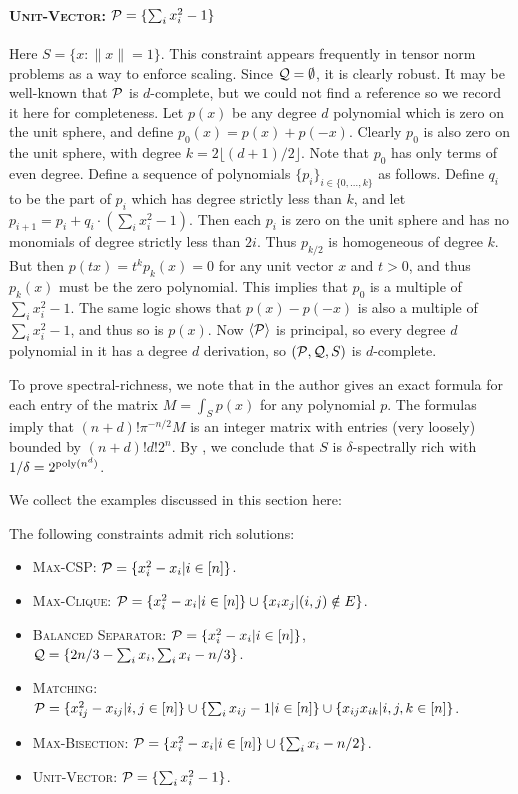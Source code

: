 \paragraph{\textsc{Unit-Vector}: $\mathcal P = \{\sum_i x_i^2 - 1\}$} Here $S = \{x: \|x\| = 1\}$. This constraint appears frequently in tensor norm problems as a way to enforce scaling. Since $\mathcal Q = \emptyset$, it is clearly robust. It may be well-known that $\mathcal P$ is $d$-complete, but we could not find a reference so we record it here for completeness. Let $p(x)$ be any degree $d$ polynomial which is zero on the unit sphere, and define $p_0(x) = p(x) + p(-x)$. Clearly $p_0$ is also zero on the unit sphere, with degree $k = 2\lfloor (d+1)/2 \rfloor$. Note that $p_0$ has only terms of even degree. 
%
Define a sequence of polynomials $\{p_i\}_{i \in \{0,\ldots, k\}}$ as follows.
Define $q_i$ to be the part of $p_i$ which has degree strictly less than $k$, and let $p_{i+1} = p_i + q_i\cdot(\sum_i x_i^2 - 1)$. Then each $p_i$ is zero on the unit sphere and has no monomials of degree strictly less than $2i$. Thus $p_{k/2}$ is homogeneous of degree $k$. But then $p(tx) = t^kp_k(x) = 0$ for any unit vector $x$ and $t > 0$, and thus $p_k(x)$ must be the zero polynomial. This implies that $p_0$ is a multiple of $\sum_i x_i^2 - 1$. The same logic shows that $p(x) - p(-x)$ is also a multiple of $\sum_i x_i^2 - 1$, and thus so is $p(x)$. Now $\langle \mathcal P\rangle$ is principal, so every degree $d$ polynomial in it has a degree $d$ derivation, so $(\mathcal P, \mathcal Q, S)$ is $d$-complete.

To prove spectral-richness, we note that in \cite{10.2307/2695802} the author gives an exact formula for each entry of the matrix $M = \int_{S} p(x)$ for any polynomial $p$. The formulas imply that $(n+d)!\pi^{-n/2} M$ is an integer matrix with entries (very loosely) bounded by $(n+d)!d!2^n$. By , we conclude that $S$ is $\delta$-spectrally rich with $1/\delta = 2^{\operatorname{poly}(n^d)}$.


We collect the examples discussed in this section here:
\begin{corollary}\label{cor:examples}
The following constraints admit rich solutions:
\begin{itemize}
\item \textsc{Max-CSP}: $\mathcal P = \{x_i^2 - x_i | i \in [n]\}$. 
\item \textsc{Max-Clique}: $\mathcal P = \{x_i^2 - x_i | i \in [n]\} \cup \{x_ix_j | (i,j) \notin E\}$.
\item \textsc{Balanced Separator}: $\mathcal P = \{x_i^2 - x_i | i \in [n]\}$, $\mathcal Q = \{2n/3 - \sum_i x_i, \sum_i x_i - n/3\}$.
\item \textsc{Matching}: $\mathcal P = \{x_{ij}^2 - x_{ij} | i,j \in [n]\} \cup \{\sum_i x_{ij} - 1 | i \in [n]\} \cup \{x_{ij}x_{ik} | i,j,k \in [n]\}$.
\item \textsc{Max-Bisection}: $\mathcal P = \{x_i^2 - x_i | i \in [n]\} \cup \{\sum_i x_i - n/2\}$.
\item \textsc{Unit-Vector}: $\mathcal P = \{\sum_i x_i^2 - 1\}$.
\end{itemize}
\end{corollary}

